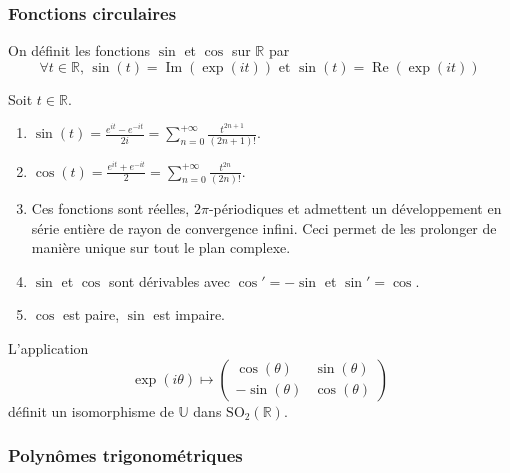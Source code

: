 	\subsubsection{Fonctions circulaires}
	
	\begin{definition}
		On définit les fonctions $\sin$ et $\cos$ sur $\mathbb{R}$ par
		\[ \forall t \in \mathbb{R}, \, \sin(t) = \operatorname{Im}(\exp(it)) \text{ et } \sin(t) = \operatorname{Re}(\exp(it)) \]
	\end{definition}
	
	
	\begin{proposition}
		Soit $t \in \mathbb{R}$.
		\begin{enumerate}[label=(\roman*)]
			\item $\sin(t) = \frac{e^{it} - e^{-it}}{2i} = \sum_{n=0}^{+\infty} \frac{t^{2n+1}}{(2n+1)!}$.
			\item $\cos(t) = \frac{e^{it} + e^{-it}}{2} = \sum_{n=0}^{+\infty} \frac{t^{2n}}{(2n)!}$.
			\item Ces fonctions sont réelles, $2\pi$-périodiques et admettent un développement en série entière de rayon de convergence infini. Ceci permet de les prolonger de manière unique sur tout le plan complexe.
			\item $\sin$ et $\cos$ sont dérivables avec $\cos' = -\sin$ et $\sin' = \cos$.
			\item $\cos$ est paire, $\sin$ est impaire.
		\end{enumerate}
	\end{proposition}
	
	\reference[ROM21]{36}
	
	\begin{proposition}
		L'application
		\[ \exp(i\theta) \mapsto
		\begin{pmatrix}
			\cos(\theta) & \sin(\theta) \\
			-\sin(\theta) & \cos(\theta)
		\end{pmatrix}
		\]
		définit un isomorphisme de $\mathbb{U}$ dans $\mathrm{SO}_2(\mathbb{R})$.
	\end{proposition}
	
	\subsubsection{Polynômes trigonométriques}
	
	
